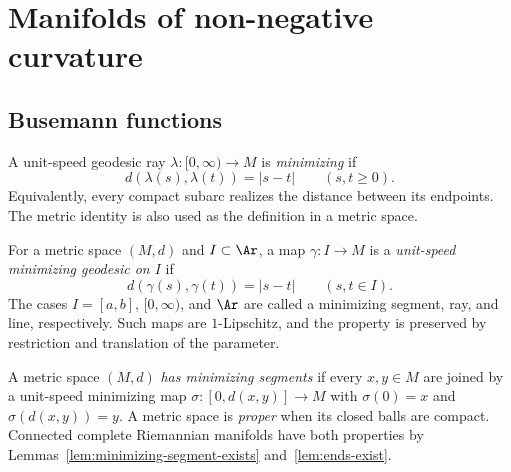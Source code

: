 \chapter{Manifolds of non-negative curvature}
\label{chap:manifolds-nonneg-curvature}
\label{nonnegcurv}

\section{Busemann functions}

\begin{definition}
\label{def:minimizing-geodesic-ray}
\leanok




A unit-speed geodesic ray $\lambda\colon[0,\infty)\to M$ is
\emph{minimizing} if
$$d(\lambda(s),\lambda(t))=|s-t|\qquad(s,t\ge0).$$
Equivalently, every compact subarc realizes the distance between its
endpoints. The metric identity is also used as the definition in a metric
space.
\end{definition}

\begin{definition}
\label{def:minimizing-geodesic-window}
\leanok




For a metric space $(M,d)$ and $I\subset\Ar$, a map $\gamma\colon I\to M$
is a \emph{unit-speed minimizing geodesic on $I$} if
$$d(\gamma(s),\gamma(t))=|s-t|\qquad(s,t\in I).$$
The cases $I=[a,b]$, $[0,\infty)$, and $\Ar$ are called a minimizing
segment, ray, and line, respectively. Such maps are $1$-Lipschitz, and the
property is preserved by restriction and translation of the parameter.
\end{definition}

\begin{definition}
\label{def:has-min-segments}
\leanok



A metric space $(M,d)$ \emph{has minimizing segments} if every $x,y\in M$
are joined by a unit-speed minimizing map
$\sigma\colon[0,d(x,y)]\to M$ with $\sigma(0)=x$ and
$\sigma(d(x,y))=y$. A metric space is \emph{proper} when its
closed balls are compact. Connected complete Riemannian manifolds have both
properties by Lemmas~\ref{lem:minimizing-segment-exists}
and~\ref{lem:ends-exist}.
\end{definition}

